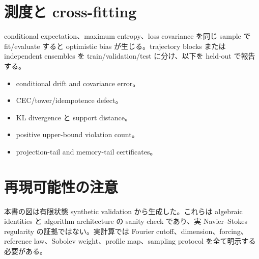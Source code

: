 \documentclass[11pt,a4paper,openany]{book}
\numberwithin{equation}{chapter}
\begin{document}
\section{測度と cross-fitting}
conditional expectation、maximum entropy、loss covariance を同じ sample で fit/evaluate すると optimistic bias が生じる。trajectory blocks または independent ensembles を train/validation/test に分け、以下を held-out で報告する。
\begin{itemize}
\item conditional drift and covariance error。
\item CEC/tower/idempotence defect。
\item KL divergence と support distance。
\item positive upper-bound violation count。
\item projection-tail and memory-tail certificates。
\end{itemize}

\section{再現可能性の注意}
本書の図は有限状態 synthetic validation から生成した。これらは algebraic identities と algorithm architecture の sanity check であり、実 Navier--Stokes regularity の証拠ではない。実計算では Fourier cutoff、dimension、forcing、reference law、Sobolev weight、profile map、sampling protocol を全て明示する必要がある。

\backmatter
\end{document}
